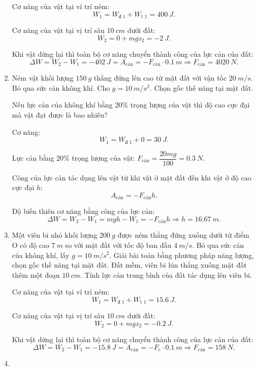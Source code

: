 \begin{enumerate}[label=\bfseries Câu \arabic*:]
	\hideall
	{	
		Cơ năng của vật tại ví trí ném:
		$$W_1 = W_\text{đ 1} + W_\text{t 1} = \SI{400}{J}.$$
		
		Cơ năng của vật tại vị trí sâu $\SI{10}{cm}$ dưới đất:
		$$W_2 = 0 + mgz_2 = \SI{-2}{J}.$$
		
		Khi vật dừng lại thì toàn bộ cơ năng chuyển thành công của lực cản của đất:
		$$\Delta W = W_2 - W_1 = \SI{-402}{J}= A_\text{cản} = -F_\text{cản} \cdot \SI{0.1}{m} \Rightarrow F_\text{cản} = \SI{4020}{N}.$$
	}
	\item {}
	
	
	{
		Ném vật khối lượng $\SI{150}{g}$ thẳng đứng lên cao từ mặt đất với vận tốc $\SI{20}{m/s}$. Bỏ qua sức cản không khí. Cho $g=\SI{10}{m/s^2}$. Chọn gốc thế năng tại mặt đất.
		
		Nếu lực cản của không khí bằng $20\%$ trọng lượng của vật thì độ cao cực đại mà vật đạt được là bao nhiêu?
	}
	
	\hideall
	{	
			Cơ năng:
		$$W_1 = W_\text{đ 1} + 0 = \SI{30}{J}.$$
		
		Lực cản bằng $20\%$ trọng lượng của vật: $F_\text{cản} = \dfrac{20 mg}{100} = \SI{0.3}{N}$.
		
		Công của lực cản tác dụng lên vật từ khi vật ở mặt đất đến khi vật ở độ cao cực đại $h$:
		$$A_\text{cản} = -F_\text{cản} h.$$
		
		Độ biến thiên cơ năng bằng công của lực cản:
		$$\Delta W = W_2 - W_1 = mgh - W_1 = -F_\text{cản} h \Rightarrow h= \SI{16.67}{m}.$$
	}
		\item {}
	
	
	{
		Một viên bi nhỏ khối lượng $\SI{200}{g}$ được ném thẳng đứng xuống dưới từ điểm O có độ cao $\SI{7}{m}$ so với mặt đất với tốc độ ban đầu $\SI{4}{m/s}$. Bỏ qua sức cản của không khí, lấy $g=\SI{10}{m/s^2}$. Giải bài toán bằng phương pháp năng lượng, chọn gốc thế năng tại mặt đất. Đất mềm, viên bi lún thẳng xuống mặt đất thêm một đoạn $\SI{10}{cm}$. Tính lực cản trung bình của đất tác dụng lên viên bi.
	}
	
	\hideall
	{	
		Cơ năng của vật tại ví trí ném:
		$$W_1 = W_\text{đ 1} + W_\text{t 1} = \SI{15.6}{J}.$$
		
		Cơ năng của vật tại vị trí sâu $\SI{10}{cm}$ dưới đất:
		$$W_2 = 0 + mgz_2 = \SI{-0.2}{J}.$$
		
		Khi vật dừng lại thì toàn bộ cơ năng chuyển thành công của lực cản của đất:
		$$\Delta W = W_2 - W_1 = \SI{-15.8}{J}= A_\text{cản} = -F_\text{c} \cdot \SI{0.1}{m} \Rightarrow F_\text{cản} = \SI{158}{N}.$$
	}
	\item {}
	

\end{enumerate}
